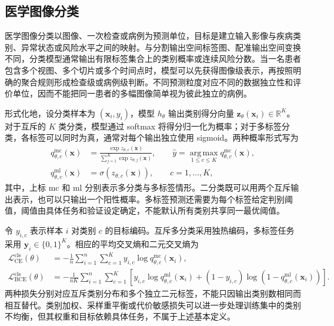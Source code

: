\subsection{医学图像分类}
\label{subsec:foundations-classification}

医学图像分类以图像、一次检查或病例为预测单位，目标是建立输入影像与疾病类别、异常状态或风险水平之间的映射。与分割输出空间标签图、配准输出空间变换不同，分类模型通常输出有限标签集合上的类别概率或连续风险分数\cite{litjens2017survey}。当一名患者包含多个视图、多个切片或多个时间点时，模型可以先获得图像级表示，再按照明确的聚合规则形成检查级或病例级判断。不同预测粒度对应不同的数据独立性和评价单位，因而不能把同一患者的多幅图像简单视为彼此独立的病例。

形式化地，设分类样本为 $(\mathbf{x}_i,y_i)$，模型 $h_\theta$ 输出类别得分向量
$\mathbf{z}_\theta(\mathbf{x}_i)\in\mathbb{R}^{K}$。对于互斥的 $K$ 类分类，模型通过 softmax 将得分归一化为概率；对于多标签分类，各标签可以同时为真，通常对每个输出独立使用 sigmoid。两种概率形式写为\cite{goodfellow2016deep}
\begin{equation}
\begin{aligned}
q_{\theta,c}^{\mathrm{mc}}(\mathbf{x})
&=
\frac{\exp z_{\theta,c}(\mathbf{x})}
{\sum_{j=1}^{K}\exp z_{\theta,j}(\mathbf{x})},
\qquad
\widehat{y}
=
\operatorname*{arg\,max}_{1\leq c\leq K}
q_{\theta,c}^{\mathrm{mc}}(\mathbf{x}),
\\
q_{\theta,c}^{\mathrm{ml}}(\mathbf{x})
&=
\sigma\!\left(z_{\theta,c}(\mathbf{x})\right),
\qquad c=1,\ldots,K ,
\end{aligned}
\label{eq:foundations-cls-probability}
\end{equation}
其中，上标 $\mathrm{mc}$ 和 $\mathrm{ml}$ 分别表示多分类与多标签情形。二分类既可以用两个互斥输出表示，也可以只输出一个阳性概率。多标签预测还需要为每个标签给定判别阈值，阈值由具体任务和验证设定确定，不能默认所有类别共享同一最优阈值。

令 $y_{i,c}$ 表示样本 $i$ 对类别 $c$ 的目标编码。互斥多分类采用独热编码，多标签任务采用
$\mathbf{y}_i\in\{0,1\}^{K}$。相应的平均交叉熵和二元交叉熵为
\begin{equation}
\begin{aligned}
\mathcal{L}_{\mathrm{CE}}^{\mathrm{cls}}(\theta)
&=
-\frac{1}{n}
\sum_{i=1}^{n}\sum_{c=1}^{K}
y_{i,c}\log q_{\theta,c}^{\mathrm{mc}}(\mathbf{x}_i),
\\
\mathcal{L}_{\mathrm{BCE}}^{\mathrm{cls}}(\theta)
&=
-\frac{1}{nK}
\sum_{i=1}^{n}\sum_{c=1}^{K}
\left[
y_{i,c}\log q_{\theta,c}^{\mathrm{ml}}(\mathbf{x}_i)
+
(1-y_{i,c})
\log\!\left(1-q_{\theta,c}^{\mathrm{ml}}(\mathbf{x}_i)\right)
\right].
\end{aligned}
\label{eq:foundations-cls-loss}
\end{equation}
两种损失分别对应互斥类别分布和多个独立二元标签，不能只因输出类别数相同而相互替代。类别加权、采样重平衡或代价敏感损失可以进一步处理训练集中的类别不均衡，但其权重和目标依赖具体任务，不属于上述基本定义。

